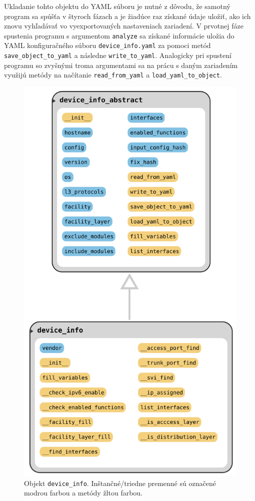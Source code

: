 Ukladanie tohto objektu do YAML súboru je nutné z dôvodu, že samotný program sa spúšťa v štyroch fázach a je žiadúce raz získané údaje uložiť, ako ich znovu vyhľadávať vo vyexportovaných nastaveniach zariadení. V prvotnej fáze spustenia programu s argumentom \texttt{analyze} sa získané informácie uložia do YAML konfiguračného súboru \texttt{device\_info.yaml} za pomoci metód \texttt{save\_object\_to\_yaml} a následne \texttt{write\_to\_yaml}. Analogicky pri spustení programu so zvyšnými troma argumentami sa na prácu s daným zariadením využijú metódy na načítanie \texttt{read\_from\_yaml} a \texttt{load\_yaml\_to\_object}.
\begin{figure}[H]
	\begin{center}
		\includegraphics[scale=0.55]{obrazky/device_info_class.pdf}
	\end{center}
	\caption[Objekt \texttt{device\_info}. Inštančné/triedne premenné sú označené modrou farbou a metódy žltou farbou.]{Objekt \texttt{device\_info}. Inštančné/triedne premenné sú označené modrou farbou a metódy žltou farbou.}
	\label{device_class}
\end{figure}

